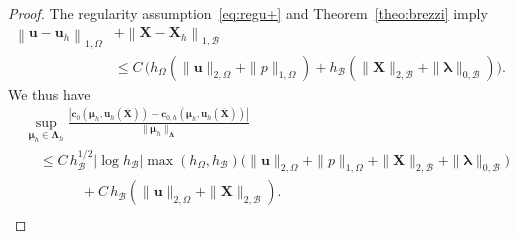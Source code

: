 \documentclass[oneside]{amsart} %
\newcommand{\norm}[1]{\left\lVert#1\right\rVert}
\newcommand\B{\mathcal B} %
\renewcommand\u{\mathbf{u}} %
\renewcommand\c{\mathbf{c}} %
\newcommand\X{\mathbf{X}} %
\newcommand\Xbar{\overline{\X}} %
\newcommand\LL{{\boldsymbol{\Lambda}}} %
\newcommand\llambda{\boldsymbol\lambda} %
\newcommand\mmu{{\boldsymbol\mu}} %
\begin{document}
\begin{proof}
		The regularity assumption~\eqref{eq:regu+} and Theorem~\ref{theo:brezzi} imply
		\begin{equation}
			\label{eq:XX_h}
			\begin{aligned}
				\norm{\u-\u_h}_{1,\Omega}& + \norm{\X-\X_h}_{1,\B}\\
				&\le
				C\,\big(h_\Omega(\|\u\|_{2,\Omega}+\|p\|_{1,\Omega})+
				h_\B(\|\X\|_{2,\B}+\|\llambda\|_{0,\B})\big).
			\end{aligned}
		\end{equation}
		We thus have
		\begin{equation}\label{eq:bound_u}
			\begin{aligned}
				&\sup_{\mmu_h\in\LL_h}\frac{|\c_0(\mmu_h,\u_h(\Xbar))-\c_{0,h}(\mmu_h,\u_h(\Xbar))|}{\|\mmu_h\|_{\LL}}\\
				&\quad\le C\,h_\B^{1/2}|\log h_\B| \max(h_\Omega,h_\B)\bigg(\|\u\|_{2,\Omega}+\|p\|_{1,\Omega}+\|\X\|_{2,\B}+\|\llambda\|_{0,\B}\bigg)\\
				&\qquad\qquad+ C\,h_\B(\|\u\|_{2,\Omega}+\|\X\|_{2,\B}).\\
			\end{aligned}
		\end{equation}
		

\end{proof}
\end{document}
